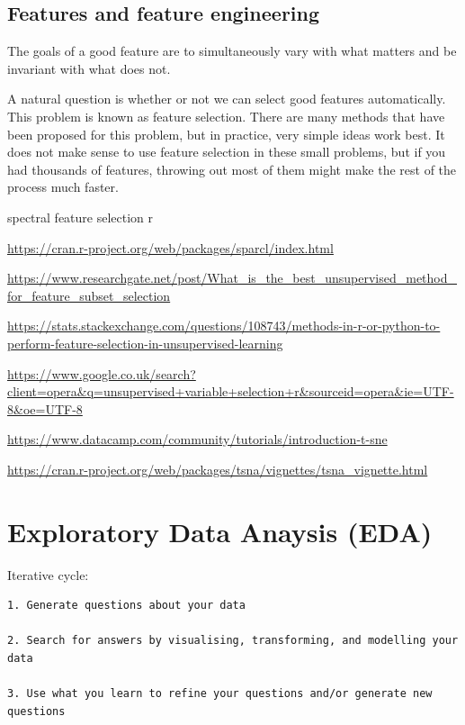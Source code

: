 \documentclass[
]{book}
\begin{document}
\hypertarget{features-and-feature-engineering}{%
\subsection{Features and feature engineering}\label{features-and-feature-engineering}}

The goals of a good feature are to simultaneously vary with what matters and be
invariant with what does not.

A natural question is whether or not we can select good features automatically.
This problem is known as feature selection. There are many methods that have
been proposed for this problem, but in practice, very simple ideas work best. It
does not make sense to use feature selection in these small problems, but if you
had thousands of features, throwing out most of them might make the rest of the
process much faster.

spectral feature selection r

\url{https://cran.r-project.org/web/packages/sparcl/index.html}

\url{https://www.researchgate.net/post/What_is_the_best_unsupervised_method_for_feature_subset_selection}

\url{https://stats.stackexchange.com/questions/108743/methods-in-r-or-python-to-perform-feature-selection-in-unsupervised-learning}

\url{https://www.google.co.uk/search?client=opera\&q=unsupervised+variable+selection+r\&sourceid=opera\&ie=UTF-8\&oe=UTF-8}

\url{https://www.datacamp.com/community/tutorials/introduction-t-sne}

\url{https://cran.r-project.org/web/packages/tsna/vignettes/tsna_vignette.html}

\hypertarget{exploratory-data-anaysis-eda}{%
\section{Exploratory Data Anaysis (EDA)}\label{exploratory-data-anaysis-eda}}

Iterative cycle:

\begin{verbatim}
1. Generate questions about your data

2. Search for answers by visualising, transforming, and modelling your data

3. Use what you learn to refine your questions and/or generate new questions
\end{verbatim}
\end{document}
